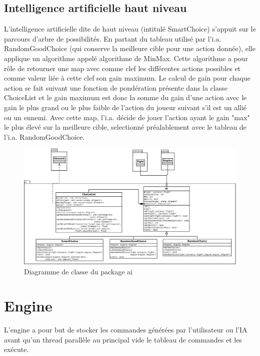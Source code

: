 \documentclass[12pt,a4paper]{report}
\begin{document}
\section{Intelligence artificielle haut niveau}

L'intelligence artificielle dite de haut niveau (intitul\'{e} SmartChoice) s'appuit sur le parcours d'arbre de possibilit\'{e}s. En partant du tableau utilis\'{e} par l'i.a. RandomGoodChoice (qui conserve la meilleure cible pour une action donn\'{e}e), elle applique un algorithme appel\'{e} algorithme de MinMax. Cette algorithme a pour r\^{o}le de retourner une map avec comme clef les diff\'{e}rentes actions possibles et comme valeur li\'{e}e \`{a} cette clef son gain maximum. Le calcul de gain pour chaque action se fait suivant une fonction de pond\'{e}ration pr\'{e}sente dans la classe ChoiceList et le gain maximum est donc la somme du gain d'une action avec le gain le plus grand ou le plus faible de l'action du joueur suivant s'il est un alli\'{e} ou un ennemi. Avec cette map, l'i.a. d\'{e}cide de jouer l'action ayant le gain "max" le plus \'{e}lev\'{e} sur la meilleure cible, selectionn\'{e} pr\'{e}alablement avec le tableau de l'i.a. RandomGoodChoice. 

\begin{figure}
\caption{Diagramme de classe du package ai}
\includegraphics[width=1\textwidth]{ai.jpeg}
\end{figure}

\chapter{Engine}

L'engine a pour but de stocker les commandes g\'{e}n\'{e}r\'{e}es par l'utilisateur ou l'IA avant qu'un thread parall\`{e}le au principal vide le tableau de commandes et les ex\'{e}cute.
\end{document}
